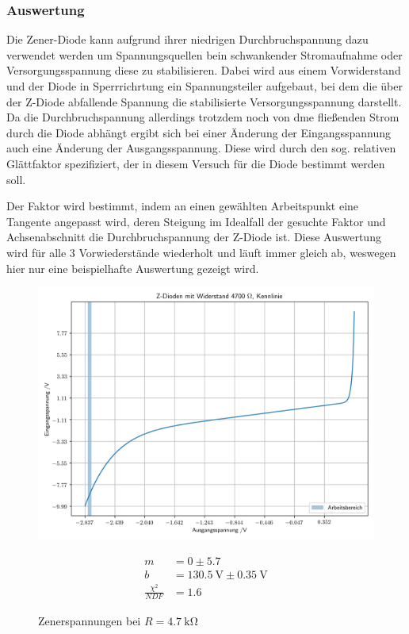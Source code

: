 \documentclass[12pt,twoside,a4paper]{scrartcl}
\begin{document}
			\subsubsection{Auswertung}
				Die Zener-Diode kann aufgrund ihrer niedrigen Durchbruchspannung dazu verwendet werden um Spannungsquellen bein schwankender Stromaufnahme oder Versorgungsspannung diese zu stabilisieren. Dabei wird aus einem Vorwiderstand und der Diode in Sperrrichrtung ein Spannungsteiler aufgebaut, bei dem die über der Z-Diode abfallende Spannung die stabilisierte Versorgungsspannung darstellt. Da die Durchbruchspannung allerdings trotzdem noch von dme fließenden Strom durch die Diode abhängt ergibt sich bei einer Änderung der Eingangsspannung auch eine Änderung der Ausgangsspannung. Diese wird durch den sog. relativen Glättfaktor spezifiziert, der in diesem Versuch für die Diode bestimmt werden soll.

				Der Faktor wird bestimmt, indem an einen gewählten Arbeitspunkt eine Tangente angepasst wird, deren Steigung im Idealfall der gesuchte Faktor und Achsenabschnitt die Durchbruchspannung der Z-Diode ist.
				Diese Auswertung wird für alle 3 Vorwiederstände wiederholt und läuft immer gleich ab, weswegen hier nur eine beispielhafte Auswertung gezeigt wird.

				\begin{figure}[H]
					\begin{minipage}{0.69 \textwidth}
						\includegraphics[width = \textwidth]{Plots/zener/spannungenZener_4700}
						\caption{Zenerspannungen bei $R = \SI{4.7}{\kilo \ohm} $}
					\end{minipage}
					\begin{minipage}{0.29 \textwidth}
						\begin{align*}
							m &= 0 \pm 5.7 \\
							b &= \SI{130.5}{ \volt } \pm \SI{0.35}{\volt} \\
							\frac{\chi^2}{NDF} &= 1.6
						\end{align*}
					\end{minipage}
				\end{figure}
\end{document}
